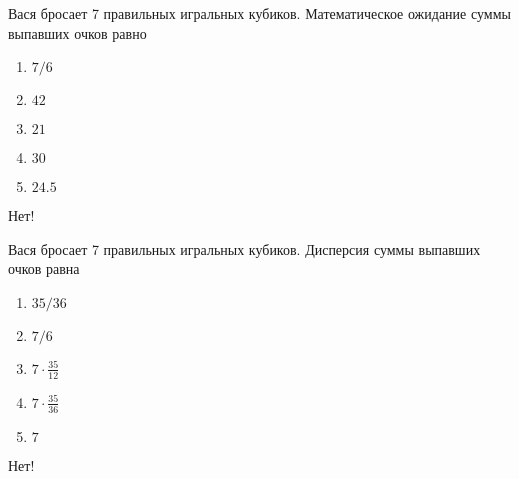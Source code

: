 \documentclass[t]{beamer}
\begin{document}
 \begin{frame} \label{9-No} 
\begin{block}{9} 

Вася бросает 7 правильных игральных кубиков. Математическое ожидание суммы выпавших очков равно
     


 \end{block} 
\begin{enumerate} 
\item[] \hyperlink{9-No}{\beamergotobutton{} $7/6$}
\item[] \hyperlink{9-No}{\beamergotobutton{} $42$
}
\item[] \hyperlink{9-No}{\beamergotobutton{} $21$}
\item[] \hyperlink{9-No}{\beamergotobutton{} $30$}
\item[] \hyperlink{9-Yes}{\beamergotobutton{} $24.5$}
\end{enumerate} 

 \alert{Нет!} 
\end{frame} 


 \begin{frame} \label{10-No} 
\begin{block}{10} 

Вася бросает 7 правильных игральных кубиков. Дисперсия суммы выпавших очков равна
 


 \end{block} 
\begin{enumerate} 
\item[] \hyperlink{10-No}{\beamergotobutton{} $35/36$}
\item[] \hyperlink{10-No}{\beamergotobutton{} $7/6$}
\item[] \hyperlink{10-Yes}{\beamergotobutton{} $7\cdot\frac{35}{12}$}
\item[] \hyperlink{10-No}{\beamergotobutton{} $7\cdot \frac{35}{36}$}
\item[] \hyperlink{10-No}{\beamergotobutton{} $7$}
\end{enumerate} 

 \alert{Нет!} 
\end{frame} 
\end{document}
